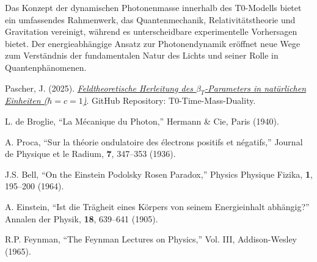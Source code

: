 \documentclass[12pt,a4paper]{article}
\begin{document}
	Das Konzept der dynamischen Photonenmasse innerhalb des T0-Modells bietet ein umfassendes Rahmenwerk, das Quantenmechanik, Relativitätstheorie und Gravitation vereinigt, während es unterscheidbare experimentelle Vorhersagen bietet. Der energieabhängige Ansatz zur Photonendynamik eröffnet neue Wege zum Verständnis der fundamentalen Natur des Lichts und seiner Rolle in Quantenphänomenen.
	
	\begin{thebibliography}{99}
		
		Pascher, J. (2025). \href{https://github.com/jpascher/T0-Time-Mass-Duality/blob/main/2/pdf/DerivationVonBetaEn.pdf}{\textit{Feldtheoretische Herleitung des $\beta_T$-Parameters in natürlichen Einheiten ($\hbar = c = 1$)}}. GitHub Repository: T0-Time-Mass-Duality.
		
		L. de Broglie, \enquote{La M\'{e}canique du Photon,} Hermann \& Cie, Paris (1940).
		
		A. Proca, \enquote{Sur la th\'{e}orie ondulatoire des \'{e}lectrons positifs et n\'{e}gatifs,} Journal de Physique et le Radium, \textbf{7}, 347--353 (1936).
		
		J.S. Bell, \enquote{On the Einstein Podolsky Rosen Paradox,} Physics Physique Fizika, \textbf{1}, 195--200 (1964).
		
		A. Einstein, \enquote{Ist die Tr\"{a}gheit eines K\"{o}rpers von seinem Energieinhalt abh\"{a}ngig?} Annalen der Physik, \textbf{18}, 639--641 (1905).
		
		R.P. Feynman, \enquote{The Feynman Lectures on Physics,} Vol. III, Addison-Wesley (1965).
		
	\end{thebibliography}
	
\end{document}
